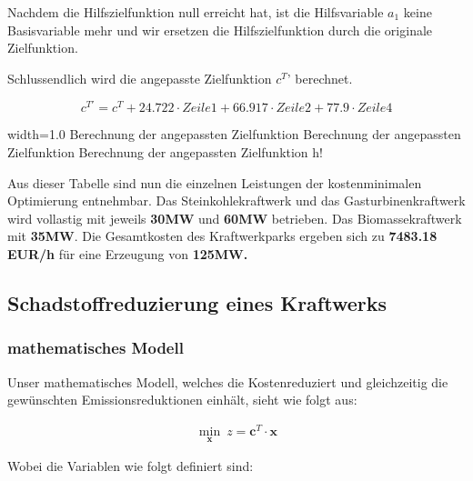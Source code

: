 \documentclass{eegreport}
\begin{document}
Nachdem die Hilfszielfunktion null erreicht hat, ist die Hilfsvariable $a_1$ keine Basisvariable mehr und wir ersetzen die Hilfszielfunktion durch die originale Zielfunktion.


Schlussendlich wird die angepasste Zielfunktion $c^T$’ berechnet. 



\begin{equation}
c^{T'} = c^T + 24.722 \cdot Zeile1 + 66.917 \cdot Zeile2 + 77.9 \cdot Zeile4
\end{equation}


       {width=1.0\textwidth}
       {Berechnung der angepassten Zielfunktion}
       {Berechnung der angepassten Zielfunktion}
       {Berechnung der angepassten Zielfunktion}
       {h!} 


Aus dieser Tabelle sind nun die einzelnen Leistungen der kostenminimalen Optimierung entnehmbar. Das Steinkohlekraftwerk und das Gasturbinenkraftwerk wird vollastig mit jeweils \textbf{30MW} und \textbf{60MW} betrieben. Das Biomassekraftwerk mit \textbf{35MW}.
Die Gesamtkosten des Kraftwerkparks ergeben sich zu \textbf{7483.18 EUR/h} für eine Erzeugung von \textbf{125MW.}











\newpage

\newpage
\subsection{Schadstoffreduzierung eines Kraftwerks}
\subsubsection{mathematisches Modell}
Unser mathematisches Modell, welches die Kostenreduziert und gleichzeitig die gewünschten Emissionsreduktionen einhält, sieht wie folgt aus:

\begin{align}
\min_{\textbf{x}}\ z = \textbf{c}^T \cdot \textbf{x}
\end{align}

Wobei die Variablen wie folgt definiert sind:
\end{document}
